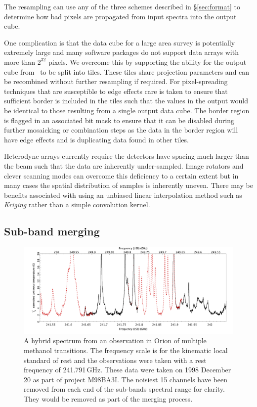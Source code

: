 \documentclass[final,authoryear,5p,times,twocolumn]{elsarticle}
\begin{document}
The resampling can use any of the three schemes described in
\S\ref{sec:format} to determine how bad pixels are propagated
from input spectra into the output cube.

One complication is that the data cube for a large area survey is
potentially extremely large and many software packages do not support
data arrays with more than $2^{32}$ pixels. We overcome this by
supporting the ability for the output cube from \makecube\ to
be split into tiles. These tiles share projection parameters and can
be recombined without further resampling if required. For
pixel-spreading techniques that are susceptible to edge effects care is
taken to ensure that sufficient border is included in the tiles such
that the values in the output would be identical to those resulting
from a single output data cube. The border region is flagged in an
associated bit mask to ensure that it can be disabled during further
mosaicking or combination steps as the data in the border region will
have edge effects and is duplicating data found in other tiles.

Heterodyne arrays currently require the detectors have spacing much
larger than the beam such that the data are inherently
under-sampled. Image rotators and clever scanning modes can overcome
this deficiency to a certain extent but in many cases the spatial
distribution of samples is inherently uneven. There may be benefits
associated with using an unbiased linear interpolation method such as
\emph{Kriging} \citep[e.g.][]{1990Cressie} rather than a simple
convolution kernel.

\subsection{Sub-band merging}

\begin{figure}[t]
\begin{minipage}{\textwidth}
\includegraphics[width=\textwidth]{hybrid}
\caption{A hybrid spectrum from an observation in Orion of multiple
  methanol transitions. The frequency scale is for the kinematic local
  standard of rest and the observations were taken with a rest
  frequency of 241.791\,GHz. These data were taken on 1998 December 20
  as part of project M98BA3I. The noisiest 15 channels have been
  removed from each end of the sub-bands spectral range for
  clarity. They would be removed as part of the merging process.}
\label{fig:hybrid}
\end{minipage}
\end{figure}
\end{document}
